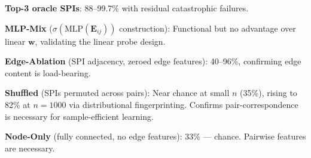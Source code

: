 \documentclass{article}
\theoremstyle{plain}
\begin{document}
\textbf{Top-3 oracle SPIs}: 88--99.7\% with residual catastrophic failures.

\textbf{MLP-Mix} ($\sigma(\mathrm{MLP}(\mathbf{E}_{ij}))$ construction): Functional but no advantage over linear $\mathbf{w}$, validating the linear probe design.

\textbf{Edge-Ablation} (SPI adjacency, zeroed edge features): 40--96\%, confirming edge content is load-bearing.

\textbf{Shuffled} (SPIs permuted across pairs): Near chance at small $n$ (35\%), rising to 82\% at $n{=}1000$ via distributional fingerprinting. Confirms pair-correspondence is necessary for sample-efficient learning.

\textbf{Node-Only} (fully connected, no edge features): 33\% --- chance. Pairwise features are necessary.
\end{document}
